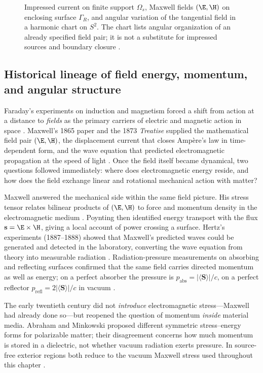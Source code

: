 \begin{figure}[t]
\centering
\VolIPhysFig{\VolIPhysThreeLevelHierarchy}
\caption{Impressed current on finite support $\Omega_s$, Maxwell fields $(\E,\H)$ on enclosing surface $\Gamma_R$, and angular variation of the tangential field in a harmonic chart on $S^2$. The chart lists angular organization of an already specified field pair; it is not a substitute for impressed sources and boundary closure \cite{stratton1941}.}
\label{fig:ch1.three-level-hierarchy}
\end{figure}

\subsection{Historical lineage of field energy, momentum, and angular structure}
\label{sec:ch01.0.historical-lineage}

Faraday's experiments on induction and magnetism forced a shift from action at a
distance to \emph{fields} as the primary carriers of electric and magnetic action in
space \cite{maxwell1873}. Maxwell's 1865 paper and the 1873 \emph{Treatise} supplied the
mathematical field pair $(\E,\H)$, the displacement current that closes Amp\`ere's law in
time-dependent form, and the wave equation that predicted electromagnetic propagation at
the speed of light \cite{maxwell1873}. Once the field itself became dynamical, two
questions followed immediately: where does electromagnetic energy reside, and how does
the field exchange linear and rotational mechanical action with matter?

Maxwell answered the mechanical side within the same field picture. His stress tensor
relates bilinear products of $(\E,\H)$ to force and momentum density in the
electromagnetic medium \cite{maxwell1873,stratton1941}. Poynting \cite{poynting1884}
then identified energy transport with the flux $\mathbf{s}=\E\times\H$, giving a local
account of power crossing a surface. Hertz's experiments (1887--1888) showed that
Maxwell's predicted waves could be generated and detected in the laboratory, converting
the wave equation from theory into measurable radiation \cite{stratton1941}. Radiation-pressure
measurements on absorbing and reflecting surfaces confirmed that the same field carries
directed momentum as well as energy; on a perfect absorber the pressure is $p_{\mathrm{abs}}=|\langle\mathbf{S}\rangle|/c$, on a
perfect reflector $p_{\mathrm{refl}}=2|\langle\mathbf{S}\rangle|/c$ in vacuum \cite{stratton1941}.

The early twentieth century did not \emph{introduce} electromagnetic stress---Maxwell
had already done so---but reopened the question of momentum \emph{inside} material
media. Abraham \cite{abraham1910} and Minkowski \cite{minkowski1908} proposed different
symmetric stress--energy forms for polarizable matter; their disagreement concerns how
much momentum is stored in a dielectric, not whether vacuum radiation exerts pressure.
In source-free exterior regions both reduce to the vacuum Maxwell stress used throughout
this chapter \cite{stratton1941}.

